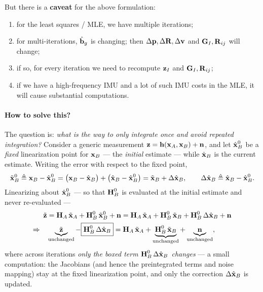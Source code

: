 But there is a \textbf{caveat} for the above formulation:
\begin{enumerate}[noitemsep,topsep=2pt]
\item for the least squares / MLE, we have multiple iterations;
\item for multi-iterations, $\hat{\boldsymbol{\mathbf{b}}}_g$ is changing; then $\Delta\boldsymbol{\mathbf{p}}, \Delta\boldsymbol{\mathbf{R}}, \Delta\boldsymbol{\mathbf{v}}$ and $\boldsymbol{\mathbf{G}}_I, \boldsymbol{\mathbf{R}}_{ij}$ will change;
\item if so, for every iteration we need to recompute $\boldsymbol{\mathbf{z}}_I$ and $\boldsymbol{\mathbf{G}}_I, \boldsymbol{\mathbf{R}}_{ij}$;
\item if we have a high-frequency IMU and a lot of such IMU costs in the MLE, it will cause substantial computations.
\end{enumerate}

\paragraph{How to solve this?} The question is: \emph{what is the way to only integrate once and avoid repeated integration?} Consider a generic measurement $\boldsymbol{\mathbf{z}} = \boldsymbol{\mathbf{h}}(\boldsymbol{\mathbf{x}}_A, \boldsymbol{\mathbf{x}}_B) + \boldsymbol{\mathbf{n}}$, and let $\hat{\boldsymbol{\mathbf{x}}}_B^0$ be a \emph{fixed} linearization point for $\boldsymbol{\mathbf{x}}_B$ --- the \emph{initial} estimate --- while $\hat{\boldsymbol{\mathbf{x}}}_B$ is the current estimate. Writing the error with respect to the fixed point,
\begin{align}
\tilde{\boldsymbol{\mathbf{x}}}_B^0 \triangleq \boldsymbol{\mathbf{x}}_B - \hat{\boldsymbol{\mathbf{x}}}_B^0
= \big(\boldsymbol{\mathbf{x}}_B - \hat{\boldsymbol{\mathbf{x}}}_B\big) + \big(\hat{\boldsymbol{\mathbf{x}}}_B - \hat{\boldsymbol{\mathbf{x}}}_B^0\big)
= \tilde{\boldsymbol{\mathbf{x}}}_B + \Delta\hat{\boldsymbol{\mathbf{x}}}_B,
\qquad \Delta\hat{\boldsymbol{\mathbf{x}}}_B \triangleq \hat{\boldsymbol{\mathbf{x}}}_B - \hat{\boldsymbol{\mathbf{x}}}_B^0.
\label{eq:lec07-fixedlin-split}
\end{align}
Linearizing about $\hat{\boldsymbol{\mathbf{x}}}_B^0$ --- so that $\boldsymbol{\mathbf{H}}_B^0$ is evaluated at the initial estimate and never re-evaluated ---
\begin{align}
\tilde{\boldsymbol{\mathbf{z}}} &= \boldsymbol{\mathbf{H}}_A\,\tilde{\boldsymbol{\mathbf{x}}}_A + \boldsymbol{\mathbf{H}}_B^0\,\tilde{\boldsymbol{\mathbf{x}}}_B^0 + \boldsymbol{\mathbf{n}}
= \boldsymbol{\mathbf{H}}_A\,\tilde{\boldsymbol{\mathbf{x}}}_A + \boldsymbol{\mathbf{H}}_B^0\,\tilde{\boldsymbol{\mathbf{x}}}_B + \boldsymbol{\mathbf{H}}_B^0\,\Delta\hat{\boldsymbol{\mathbf{x}}}_B + \boldsymbol{\mathbf{n}} \notag \\
\Rightarrow\quad
&\underbrace{\tilde{\boldsymbol{\mathbf{z}}}}_{\text{unchanged}} - \boxed{\boldsymbol{\mathbf{H}}_B^0\,\Delta\hat{\boldsymbol{\mathbf{x}}}_B}
= \boldsymbol{\mathbf{H}}_A\,\tilde{\boldsymbol{\mathbf{x}}}_A + \underbrace{\boldsymbol{\mathbf{H}}_B^0\,\tilde{\boldsymbol{\mathbf{x}}}_B}_{\text{unchanged}} + \underbrace{\boldsymbol{\mathbf{n}}}_{\text{unchanged}},
\label{eq:lec07-fixedlin}
\end{align}
where across iterations \emph{only the boxed term $\boldsymbol{\mathbf{H}}_B^0\,\Delta\hat{\boldsymbol{\mathbf{x}}}_B$ changes} --- a small computation: the Jacobians (and hence the preintegrated terms and noise mapping) stay at the fixed linearization point, and only the correction $\Delta\hat{\boldsymbol{\mathbf{x}}}_B$ is updated.

